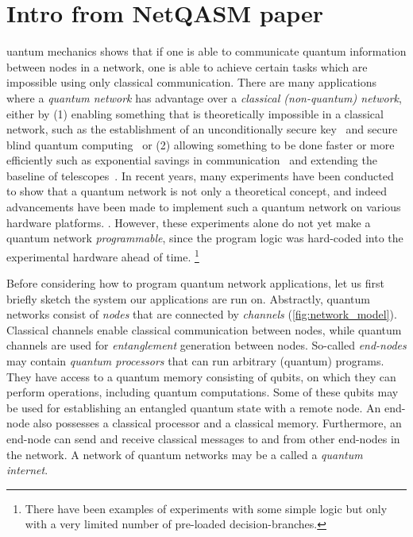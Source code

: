 \section{Intro from NetQASM paper}

uantum mechanics shows that if one is able to communicate quantum information between nodes in a network, one is able to achieve certain tasks which are impossible using only classical communication.
There are many applications~\cite{Wehner2018stages} where a \emph{quantum network} has advantage over a \emph{classical (non-quantum) network}, either by
    (1) enabling something that is theoretically impossible in a classical network, such as the establishment of an unconditionally secure key~\cite{bb84} and secure blind quantum computing~\cite{childs2005assisted} or
    (2) allowing something to be done faster or more efficiently such as exponential savings in communication~\cite{Buhrman2010} and extending the baseline of telescopes~\cite{gottesman2012longer}.
In recent years, many experiments have been conducted to show that a quantum network is not only a theoretical concept, and indeed advancements have been made to implement such a quantum network on various hardware platforms.
\cite{Hensen2015, Humphreys2018, moehring2007entanglement, hofmann2012heralded, Kalb2017, Inlek2017, sangouard2011quantum}.
However, these experiments alone do not yet make a quantum network \textit{programmable}, since the program logic was hard-coded into the experimental hardware ahead of time.
\footnote{There have been examples of experiments with some simple logic but only with a very limited number of pre-loaded decision-branches.}

Before considering how to program quantum network applications, let us first briefly sketch the system our applications are run on.
Abstractly, quantum networks consist of \textit{nodes} that are connected by \textit{channels} (\cref{fig:network_model}).
Classical channels enable classical communication between nodes, while quantum channels are used for \textit{entanglement} generation between nodes.
So-called \textit{end-nodes} may contain \textit{quantum processors} that can run arbitrary (quantum) programs.
They have access to a quantum memory consisting of qubits, on which they can perform operations, including quantum computations.
Some of these qubits may be used for establishing an entangled quantum state with a remote node.
An end-node also possesses a classical processor and a classical memory.
Furthermore, an end-node can send and receive classical messages to and from other end-nodes in the network.
A network of quantum networks may be a called a \textit{quantum internet}.

